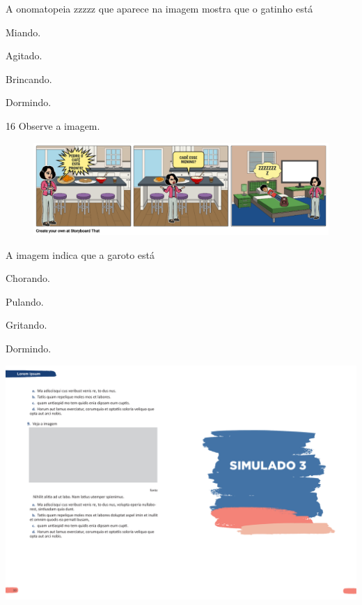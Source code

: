
A onomatopeia zzzzz que aparece na imagem mostra que o gatinho está

\begin{escolha}
\item Miando.

\item Agitado.

\item Brincando.

\item Dormindo.
\end{escolha}

\num{16} Observe a imagem.

\begin{figure}[htpb!]
\centering
\includegraphics[width=.5\textwidth]{media/image162.png}
\end{figure}


A imagem indica que a garoto está

\begin{escolha}
\item Chorando.

\item Pulando.

\item Gritando.

\item Dormindo.
\end{escolha}

\vspace*{-3.4cm}
\hspace*{-3.7cm}\includegraphics[scale=1]{../watermarks/3simulado5ano.pdf}

